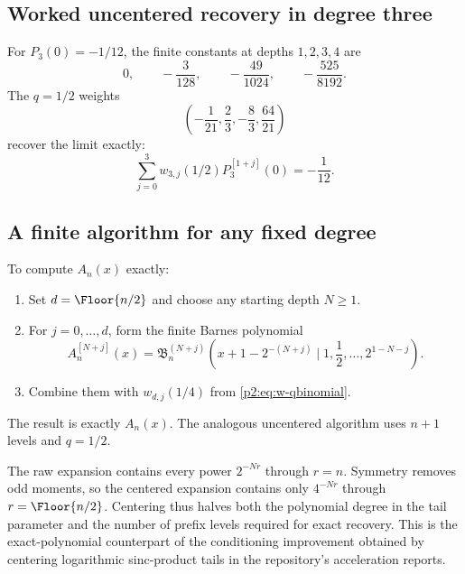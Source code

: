 \documentclass[11pt,oneside]{article}
\numberwithin{equation}{section}
\theoremstyle{definition}
\theoremstyle{remark}
\begin{document}
\subsection{Worked uncentered recovery in degree three}

For $P_3(0)=-1/12$, the finite constants at depths $1,2,3,4$ are
\begin{equation}
 0,
 \qquad -\frac3{128},
 \qquad -\frac{49}{1024},
 \qquad -\frac{525}{8192}.
 \label{p2:eq:P3-prefix-values}
\end{equation}
The $q=1/2$ weights
\begin{equation}
 \left(-\frac1{21},\frac23,-\frac83,\frac{64}{21}\right)
 \label{p2:eq:q12-weights3}
\end{equation}
recover the limit exactly:
\begin{equation}
 \sum_{j=0}^{3}w_{3,j}(1/2)P_3^{[1+j]}(0)=-\frac1{12}.
 \label{p2:eq:P3-exact-example}
\end{equation}

\subsection{A finite algorithm for any fixed degree}

\begin{algorithm}
\label{p2:alg:exact-Appell}
To compute $A_n(x)$ exactly:
\begin{enumerate}
\item Set $d=\Floor{n/2}$ and choose any starting depth $N\ge1$.
\item For $j=0,\ldots,d$, form the finite Barnes polynomial
\[
 A_n^{[N+j]}(x)
 =\mathfrak B_n^{(N+j)}
 \left(x+1-2^{-(N+j)}\mid1,\frac12,\ldots,2^{1-N-j}\right).
\]
\item Combine them with $w_{d,j}(1/4)$ from \eqref{p2:eq:w-qbinomial}.
\end{enumerate}
The result is exactly $A_n(x)$.  The analogous uncentered algorithm uses $n+1$ levels and
$q=1/2$.
\end{algorithm}

\begin{remark}
The raw expansion contains every power $2^{-Nr}$ through $r=n$.  Symmetry removes odd moments,
so the centered expansion contains only $4^{-Nr}$ through $r=\Floor{n/2}$.  Centering thus
halves both the polynomial degree in the tail parameter and the number of prefix levels required for
exact recovery.  This is the exact-polynomial counterpart of the conditioning improvement obtained
by centering logarithmic sinc-product tails in the repository's acceleration reports.
\end{remark}
\end{document}
